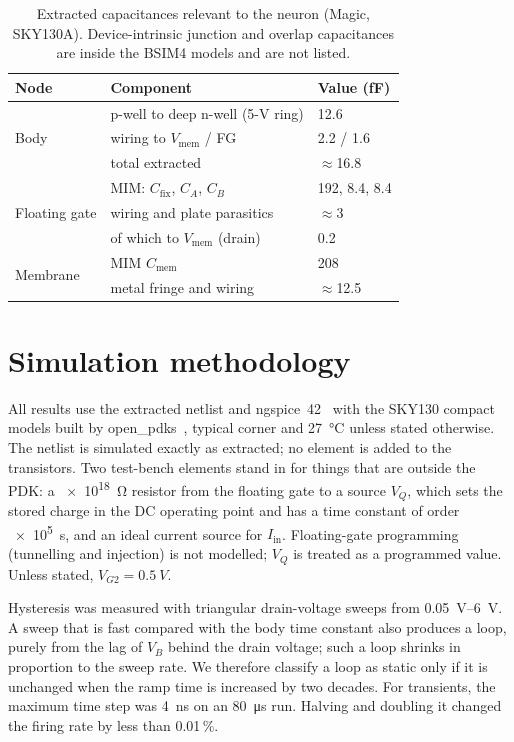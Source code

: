 \documentclass[a4paper,fleqn]{cas-dc}
\begin{document}
\begin{table}[t]
\centering
\caption{Extracted capacitances relevant to the neuron (Magic, SKY130A). Device-intrinsic junction and overlap capacitances are inside the BSIM4 models and are not listed.}
\label{tab:pex}
\begin{tabular}{@{}lll@{}}
\toprule
Node & Component & Value (fF) \\
\midrule
\multirow{3}{*}{Body} & p-well to deep n-well (5-V ring) & 12.6 \\
 & wiring to $V_{\mathrm{mem}}$ / FG & 2.2 / 1.6 \\
 & total extracted & $\approx$16.8 \\
\midrule
\multirow{3}{*}{Floating gate} & MIM: $C_{\mathrm{fix}}$, $C_A$, $C_B$ & 192, 8.4, 8.4 \\
 & wiring and plate parasitics & $\approx$3 \\
 & of which to $V_{\mathrm{mem}}$ (drain) & 0.2 \\
\midrule
\multirow{2}{*}{Membrane} & MIM $C_{\mathrm{mem}}$ & 208 \\
 & metal fringe and wiring & $\approx$12.5 \\
\bottomrule
\end{tabular}
\end{table}

\section{Simulation methodology}
\label{sec:method}

All results use the extracted netlist and ngspice~42~\cite{ngspice} with the SKY130 compact models built by open\_pdks~\cite{sky130pdk,openpdks}, typical corner and \SI{27}{\celsius} unless stated otherwise. The netlist is simulated exactly as extracted; no element is added to the transistors. Two test-bench elements stand in for things that are outside the PDK: a \SI{e18}{\ohm} resistor from the floating gate to a source $V_Q$, which sets the stored charge in the DC operating point and has a time constant of order \SI{e5}{s}, and an ideal current source for $I_{\mathrm{in}}$. Floating-gate programming (tunnelling and injection) is not modelled; $V_Q$ is treated as a programmed value. Unless stated, $V_{G2} = \SI{0.5}{V}$.

Hysteresis was measured with triangular drain-voltage sweeps from \SIrange{0.05}{6}{V}. A sweep that is fast compared with the body time constant also produces a loop, purely from the lag of $V_B$ behind the drain voltage; such a loop shrinks in proportion to the sweep rate. We therefore classify a loop as static only if it is unchanged when the ramp time is increased by two decades. For transients, the maximum time step was \SI{4}{ns} on an \SI{80}{\micro\second} run. Halving and doubling it changed the firing rate by less than 0.01\,\%.
\end{document}
